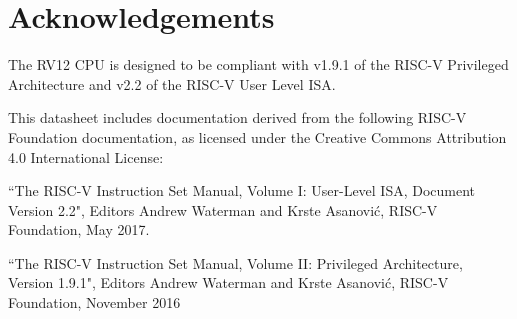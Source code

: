 \section{ Acknowledgements}\label{acknowledgements}

The RV12 CPU is designed to be compliant with v1.9.1 of the RISC-V
Privileged Architecture and v2.2 of the RISC-V User Level ISA.

This datasheet includes documentation derived from the following RISC-V
Foundation documentation, as licensed under the Creative Commons
Attribution 4.0 International License:

``The RISC-V Instruction Set Manual, Volume I: User-Level ISA, Document
Version 2.2", Editors Andrew Waterman and Krste Asanović, RISC-V
Foundation, May 2017.

``The RISC-V Instruction Set Manual, Volume II: Privileged Architecture,
Version 1.9.1", Editors Andrew Waterman and Krste Asanović, RISC-V
Foundation, November 2016